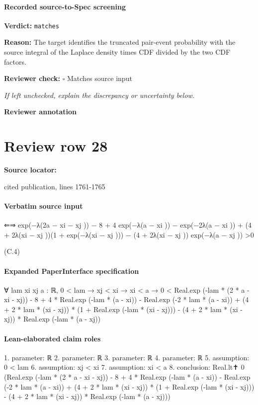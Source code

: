 \documentclass[10pt]{article}
\newcommand{\reviewerbox}{%
  \par\noindent\fbox{\parbox{0.96\linewidth}{\rule{0pt}{0.38in}}}\par
}
\newcommand{\reviewmatch}[1]{%
  \par\noindent\textbf{Reviewer check:} $\square$\; #1\par
  \noindent\emph{If left unchecked, explain the discrepancy or uncertainty below.}\par
}
\begin{document}
\paragraph{Recorded source-to-Spec screening}
\textbf{Verdict:} \texttt{matches}
\\
{\raggedright
\textbf{Reason:} The target identifies the truncated pair-\allowbreak{}event probability with the source integral of the Laplace density times CDF divided by the two CDF factors.\allowbreak{}
\par}
\reviewmatch{Matches source input}
\noindent\textbf{Reviewer annotation}\par
\reviewerbox
\clearpage
\hypertarget{source-claim-29d2b7baa5996f3d}{}
\section*{Review row 28}
\textbf{Source locator:} {\footnotesize\raggedright cited publication, lines 1761-\allowbreak{}1765\par}
\paragraph{Verbatim source input}
\begin{ReviewVerbatim}
⇐⇒ exp(−λ(2a − xi − xj )) − 8 + 4 exp(−λ(a − xi )) − exp(−2λ(a − xi ))
+ (4 + 2λ(xi − xj ))(1 + exp(−λ(xi − xj ))) − (4 + 2λ(xi − xj )) exp(−λ(a − xj ))
>0

(C.4)
\end{ReviewVerbatim}



\paragraph{Expanded PaperInterface specification}
\begin{ReviewVerbatim}
∀ {lam xi xj a : ℝ},
  0 < lam →
    xj < xi →
      xi < a →
        0 <
          Real.exp (-lam * (2 * a - xi - xj)) - 8 + 4 * Real.exp (-lam * (a - xi)) - Real.exp (-2 * lam * (a - xi)) +
              (4 + 2 * lam * (xi - xj)) * (1 + Real.exp (-lam * (xi - xj))) -
            (4 + 2 * lam * (xi - xj)) * Real.exp (-lam * (a - xj))
\end{ReviewVerbatim}


\paragraph{Lean-elaborated claim roles}\begin{ReviewVerbatim}
1. parameter: ℝ
2. parameter: ℝ
3. parameter: ℝ
4. parameter: ℝ
5. assumption: 0 < lam
6. assumption: xj < xi
7. assumption: xi < a
8. conclusion: Real.lt✝ 0
  (Real.exp (-lam * (2 * a - xi - xj)) - 8 + 4 * Real.exp (-lam * (a - xi)) - Real.exp (-2 * lam * (a - xi)) +
      (4 + 2 * lam * (xi - xj)) * (1 + Real.exp (-lam * (xi - xj))) -
    (4 + 2 * lam * (xi - xj)) * Real.exp (-lam * (a - xj)))
\end{ReviewVerbatim}
\end{document}
